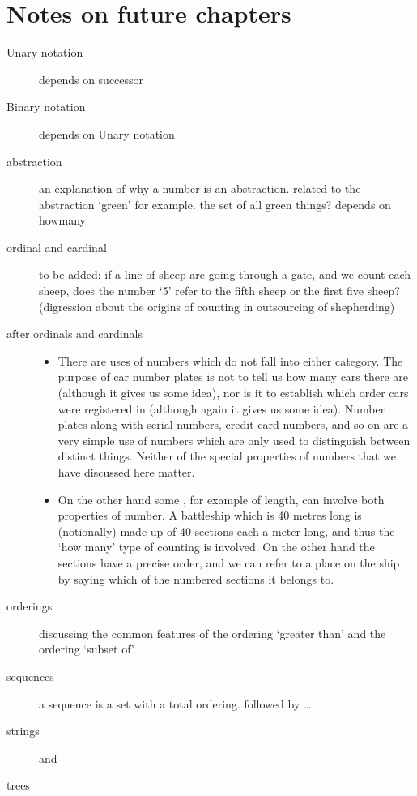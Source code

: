 \chapter{Notes on future chapters}

\begin{description}

\item[Unary notation]
depends on successor

\item[Binary notation]
depends on Unary notation

\item[abstraction]
an explanation of why a number is an abstraction. related to the abstraction `green' for example. the set of all green things?
depends on howmany

\item[ordinal and cardinal]
to be added:
if a line of sheep are going through a gate, and we count each sheep, does the number `5' refer to the fifth sheep or the first five sheep?
(digression about the origins of counting in outsourcing of shepherding)

\item[after ordinals and cardinals]
\begin{itemize}
\item
There are uses of numbers which do not fall into either category. The purpose of car number plates is not to tell us how many cars there are (although it gives us some idea), nor is it to establish which order cars were registered in (although again it gives us some idea). Number plates along with serial numbers, credit card numbers, and so on are a very simple use of numbers which are only used to distinguish between distinct things. Neither of the special properties of numbers that we have discussed here matter.
\item
On the other hand some , for example of length, can involve both properties of number. A battleship which is 40 metres long is (notionally) made up of 40 sections each a meter long, and thus the `how many' type of counting is involved. On the other hand the sections have a precise order, and we can refer to a place on the ship by saying which of the numbered sections it belongs to.
\end{itemize}

\item[orderings]
discussing the common features of the ordering `greater than' and the ordering `subset of'. 
\item[sequences]
a sequence is a set with a total ordering.
followed by \ldots
\item[strings]
and 
\item[trees]


\end{description}
